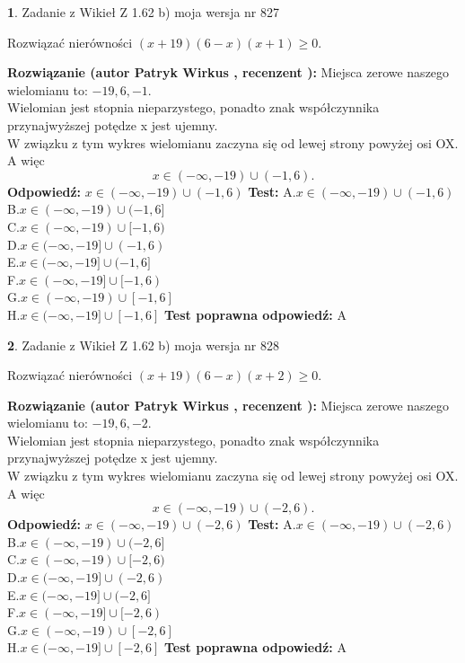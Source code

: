 \documentclass[12pt, a4paper]{article}
\theoremstyle{definition} %
\newtheorem{zad}{}
\newcommand{\zadStart}[1]{\begin{zad}#1\newline}
\newcommand{\zadStop}{\end{zad}}
\newcommand{\rozwStart}[2]{\noindent \textbf{Rozwiązanie (autor #1 , recenzent #2): }\newline}
\newcommand{\rozwStop}{\newline}
\newcommand{\odpStart}{\noindent \textbf{Odpowiedź:}\newline}
\newcommand{\odpStop}{\newline}
\newcommand{\testStart}{\noindent \textbf{Test:}\newline}
\newcommand{\testStop}{\newline}
\newcommand{\kluczStart}{\noindent \textbf{Test poprawna odpowiedź:}\newline}
\newcommand{\kluczStop}{\newline}
\begin{document}
\zadStart{Zadanie z Wikieł Z 1.62 b) moja wersja nr 827}

Rozwiązać nierówności $(x+19)(6-x)(x+1)\ge0$.
\zadStop
\rozwStart{Patryk Wirkus}{}
Miejsca zerowe naszego wielomianu to: $-19, 6, -1$.\\
Wielomian jest stopnia nieparzystego, ponadto znak współczynnika przy\linebreak najwyższej potędze x jest ujemny.\\ W związku z tym wykres wielomianu zaczyna się od lewej strony powyżej osi OX. A więc $$x \in (-\infty,-19) \cup (-1,6).$$
\rozwStop
\odpStart
$x \in (-\infty,-19) \cup (-1,6)$
\odpStop
\testStart
A.$x \in (-\infty,-19) \cup (-1,6)$\\
B.$x \in (-\infty,-19) \cup (-1,6]$\\
C.$x \in (-\infty,-19) \cup [-1,6)$\\
D.$x \in (-\infty,-19] \cup (-1,6)$\\
E.$x \in (-\infty,-19] \cup (-1,6]$\\
F.$x \in (-\infty,-19] \cup [-1,6)$\\
G.$x \in (-\infty,-19) \cup [-1,6]$\\
H.$x \in (-\infty,-19] \cup [-1,6]$
\testStop
\kluczStart
A
\kluczStop



\zadStart{Zadanie z Wikieł Z 1.62 b) moja wersja nr 828}

Rozwiązać nierówności $(x+19)(6-x)(x+2)\ge0$.
\zadStop
\rozwStart{Patryk Wirkus}{}
Miejsca zerowe naszego wielomianu to: $-19, 6, -2$.\\
Wielomian jest stopnia nieparzystego, ponadto znak współczynnika przy\linebreak najwyższej potędze x jest ujemny.\\ W związku z tym wykres wielomianu zaczyna się od lewej strony powyżej osi OX. A więc $$x \in (-\infty,-19) \cup (-2,6).$$
\rozwStop
\odpStart
$x \in (-\infty,-19) \cup (-2,6)$
\odpStop
\testStart
A.$x \in (-\infty,-19) \cup (-2,6)$\\
B.$x \in (-\infty,-19) \cup (-2,6]$\\
C.$x \in (-\infty,-19) \cup [-2,6)$\\
D.$x \in (-\infty,-19] \cup (-2,6)$\\
E.$x \in (-\infty,-19] \cup (-2,6]$\\
F.$x \in (-\infty,-19] \cup [-2,6)$\\
G.$x \in (-\infty,-19) \cup [-2,6]$\\
H.$x \in (-\infty,-19] \cup [-2,6]$
\testStop
\kluczStart
A
\kluczStop
\end{document}

